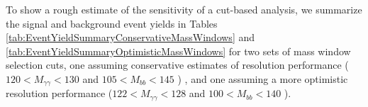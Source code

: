 \documentclass{cmspaper}
\begin{document}





To show a rough estimate of the sensitivity of a cut-based analysis, we
summarize the signal and background event yields in 
Tables \ref{tab:EventYieldSummaryConservativeMassWindows}
and \ref{tab:EventYieldSummaryOptimisticMassWindows} 
for two sets of mass window selection cuts, one assuming
conservative estimates of resolution performance ( $120 < M_{\gamma\gamma} < 130$ and 
 $105 < M_{bb} < 145$ ) , and one assuming a more optimistic resolution
performance ($122 < M_{\gamma\gamma} < 128$ and  $100 < M_{bb} < 140$ ).
\end{document}
